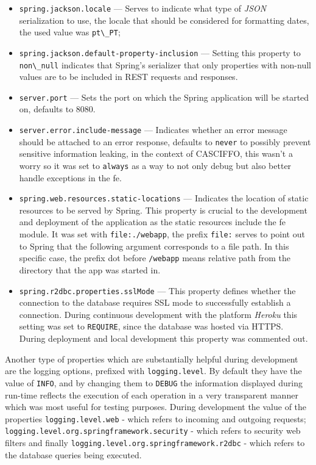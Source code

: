 \begin{itemize}
    \item \lstinline{spring.jackson.locale} --- Serves to indicate what type of \textit{JSON} serialization to use, the locale that should be considered for formatting dates, the used value was \lstinline{pt\_PT};
    
    \item \lstinline{spring.jackson.default-property-inclusion} --- Setting this property to \lstinline{non\_null} indicates that Spring's serializer that only properties with non-null values are to be included in REST requests and responses.
    
    \item \lstinline{server.port} --- Sets the port on which the Spring application will be started on, defaults to 8080.
    
    \item \lstinline{server.error.include-message} --- Indicates whether an error message should be attached to an error response, defaults to \lstinline{never} to possibly prevent sensitive information leaking, in the context of CASCIFFO, this wasn't a worry so it was set to \lstinline{always} as a way to not only debug but also better handle exceptions in the \acrshort{fe}.
    
    \item \lstinline{spring.web.resources.static-locations} --- Indicates the location of static resources to be served by Spring. This property is crucial to the development and deployment of the application as the static resources include the \acrshort{fe} module. It was set with \lstinline{file:./webapp}, the prefix \lstinline{file:} serves to point out to Spring that the following argument corresponds to a file path. In this specific case, the prefix dot before \lstinline{/webapp} means relative path from the directory that the app was started in. 
    
    \item \lstinline{spring.r2dbc.properties.sslMode} --- This property defines whether the connection to the database requires SSL mode to successfully establish a connection. During continuous development with the platform \textit{Heroku} this setting was set to \lstinline{REQUIRE}, since the database was hosted via HTTPS. During deployment and local development this property was commented out. 
\end{itemize}   

Another type of properties which are substantially helpful during development are the logging options, prefixed with \lstinline{logging.level}. 
By default they have the value of \lstinline{INFO}, and by changing them to \lstinline{DEBUG} the information displayed during run-time reflects the execution of each operation in a very transparent manner which was most useful for testing purposes. 
During development the value of the properties \lstinline{logging.level.web} - which refers to incoming and outgoing requests; \lstinline{logging.level.org.springframework.security} - which refers to security web filters and finally \lstinline{logging.level.org.springframework.r2dbc} - which refers to the database queries being executed. 

